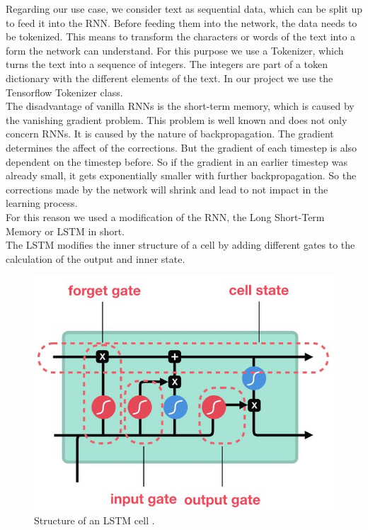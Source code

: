 \documentclass[hidelinks, conference]{IEEEtran}
\begin{document}
Regarding our use case, we consider text as sequential data, which can be split up to feed it into the RNN. Before feeding them into the network, the data needs to be tokenized. This means to transform the characters or words of the text into a form the network can understand. For this purpose we use a Tokenizer, which turns the text into a sequence of integers. The integers are part of a token dictionary with the different elements of the text. In our project we use the Tensorflow Tokenizer class.\\
The disadvantage of vanilla RNNs is the short-term memory, which is caused by the vanishing gradient problem. This problem is well known and does not only concern RNNs. It is caused by the nature of backpropagation. The gradient determines the affect of the corrections. But the gradient of each timestep is also dependent on the timestep before. So if the gradient in an earlier timestep was already small, it gets exponentially smaller with further backpropagation. So the corrections made by the network will shrink and lead to not impact in the learning process.\\
For this reason we used a modification of the RNN, the Long Short-Term Memory or LSTM in short.\\
The LSTM modifies the inner structure of a cell by adding different gates to the calculation of the output and inner state.

\begin{figure}[htbp]
\centerline{\includegraphics[scale=0.5]{pictures/structure_lstm.png}}
\caption{Structure of an LSTM cell \cite{tim3}.}
\label{fig:structure_lstm}
\end{figure}
\end{document}
